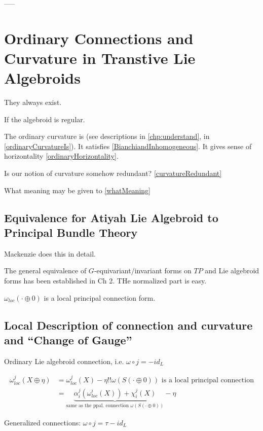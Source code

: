 {\begin{itemize}
    \end{itemize}

-----



\section*{Ordinary Connections and Curvature in Transtive Lie Algebroids}

They always exist.

If the algebroid is regular.

The ordinary curvature is (see descriptions in \ref{chp:understand}, in \ref{ordinaryCurvatureIs}). It satisfies \ref{BianchiandInhomogeneous}. It gives sense of horizontality \ref{ordinaryHorizontality}.

Is our notion of curvature somehow redundant? \ref{curvatureRedundant}

What meaning may be given to \ref{whatMeaning}


\subsection*{Equivalence for Atiyah Lie Algebroid to Principal Bundle Theory}

Mackenzie does this in detail.

The general equivalence of $G$-equivariant/invariant forms on $TP$ and Lie algebroid forms has been established in Ch 2. THe normalized part is easy.

$\omega_{loc}(\cdot \oplus 0)$ is a local principal connection form.

\subsection*{Local Description of connection and curvature and ``Change of Gauge''}

Ordinary Lie algebroid connection, i.e. $\omega \circ j = - id_L$

\begin{align}
    \omega^j_{loc}(X \oplus \eta) 
    &= \omega^j_{loc}(X) - \eta !!\text{$\omega(S(\cdot \oplus 0))$ is a local principal connection}\\
    &= \underbrace{\alpha^j_i(\omega^i_{loc}(X)) + \chi^j_i(X)}_{\text{same as the ppal. connection $\omega(S(\cdot \oplus 0))$}}- \eta
\end{align}

Generalized connections: $\omega \circ j = \tau - id_L$

}
